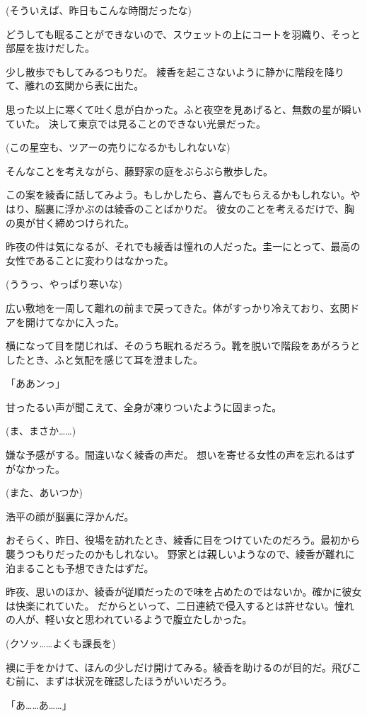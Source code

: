﻿\documentclass[
    book,tate,
    line_length=30zw,
    jafontsize=12pt,
    paper=b5j,
    landscape,
    ]{jlreq}
\begin{document}
(そういえば、昨日もこんな時間だったな)

どうしても眠ることができないので、スウェットの上にコートを羽織り、そっと部屋を抜けだした。

少し散歩でもしてみるつもりだ。 綾香を起こさないように静かに階段を降りて、離れの玄関から表に出た。

思った以上に寒くて吐く息が白かった。ふと夜空を見あげると、無数の星が瞬いていた。
決して東京では見ることのできない光景だった。

(この星空も、ツアーの売りになるかもしれないな)

そんなことを考えながら、藤野家の庭をぶらぶら散歩した。

この案を綾香に話してみよう。もしかしたら、喜んでもらえるかもしれない。やはり、脳裏に浮かぶのは綾香のことばかりだ。
彼女のことを考えるだけで、胸の奥が甘く締めつけられた。

昨夜の件は気になるが、それでも綾香は憧れの人だった。圭一にとって、最高の女性であることに変わりはなかった。

(ううっ、やっぱり寒いな)

広い敷地を一周して離れの前まで戻ってきた。体がすっかり冷えており、玄関ドアを開けてなかに入った。

横になって目を閉じれば、そのうち眠れるだろう。靴を脱いで階段をあがろうとしたとき、ふと気配を感じて耳を澄ました。

「ああンっ」

甘ったるい声が聞こえて、全身が凍りついたように固まった。

(ま、まさか……)

嫌な予感がする。間違いなく綾香の声だ。 想いを寄せる女性の声を忘れるはずがなかった。

(また、あいつか)

浩平の顔が脳裏に浮かんだ。

おそらく、昨日、役場を訪れたとき、綾香に目をつけていたのだろう。最初から襲うつもりだったのかもしれない。
野家とは親しいようなので、綾香が離れに泊まることも予想できたはずだ。

昨夜、思いのほか、綾香が従順だったので味を占めたのではないか。確かに彼女は快楽にれていた。
だからといって、二日連続で侵入するとは許せない。憧れの人が、軽い女と思われているようで腹立たしかった。

(クソッ……よくも課長を)

襖に手をかけて、ほんの少しだけ開けてみる。綾香を助けるのが目的だ。飛びこむ前に、まずは状況を確認したほうがいいだろう。

「あ……あ……」
\end{document}
